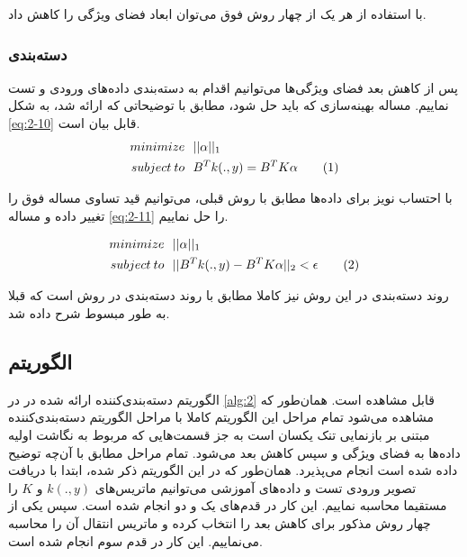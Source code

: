 \documentclass[12pt,twocolumn]{article}
\newcommand\numberthis[1][]{%
    \refstepcounter{equation}%
    \ifx#1\empty\else\label{eq:#1}\fi%
    \tag{\theequation}%
}
\begin{document}
  با استفاده از هر یک از چهار روش فوق می‌توان ابعاد فضای ویژگی را کاهش داد.

\subsubsection{دسته‌بندی}
پس از کاهش بعد فضای ویژگی‌ها می‌توانیم اقدام به دسته‌بندی داده‌های ورودی و تست نماییم. مساله بهینه‌سازی که باید حل شود، مطابق با توضیحاتی که ارائه شد، به شکل \eqref{eq:2-10} قابل بیان است.
\begin{align*}
minimize& \>\>\> ||\alpha||_1  \\
subject \> to& \>\>\> B^Tk(.,y) = B^TK\alpha
\numberthis
\label{eq:2-10}
\end{align*}

 با احتساب نویز برای داده‌ها مطابق با روش قبلی، می‌توانیم قید تساوی مساله فوق را تغییر داده و مساله 
 \eqref{eq:2-11}
  را حل نماییم.
  
\begin{align*}
minimize& \>\>\> ||\alpha||_1  \\
subject \> to& \>\>\> ||B^Tk(.,y) - B^TK\alpha||_2 < \epsilon
\numberthis
\label{eq:2-11}
\end{align*} 
 
روند دسته‌بندی در این روش نیز کاملا مطابق با روند دسته‌بندی در روش  است که قبلا به طور مبسوط شرح داده شد.


\subsection{الگوریتم}

الگوریتم دسته‌بندی‌کننده ارائه شده در \cite{zhang2012kernel} در \ref{alg:2} قابل مشاهده است. همان‌طور که مشاهده می‌شود تمام مراحل این الگوریتم کاملا با مراحل الگوریتم دسته‌بندی‌کننده مبتنی بر بازنمایی تنک یکسان است به جز قسمت‌هایی که مربوط به نگاشت اولیه داده‌ها به فضای ویژگی و سپس کاهش بعد می‌شود. تمام مراحل مطابق با آن‌چه توضیح داده‌ شده است انجام می‌پذیرد. همان‌طور که در این الگوریتم ذکر شده، ابتدا با دریافت تصویر ورودی تست و داده‌های آموزشی می‌توانیم ماتریس‌های $k(.,y)$ و $K$ را مستقیما محاسبه نماییم. این کار در قدم‌های یک و دو انجام شده است. سپس یکی از چهار روش مذکور برای کاهش بعد را انتخاب کرده و ماتریس انتقال آن را محاسبه می‌نماییم. این کار در قدم سوم انجام شده است.
\end{document}
